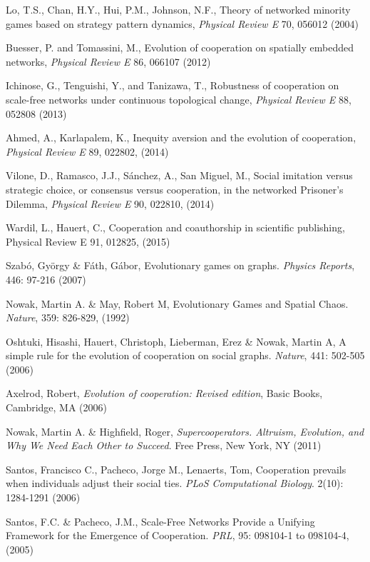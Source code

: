 \begin{thebibliography}{50}
 Lo, T.S., Chan, H.Y., Hui, P.M., Johnson, N.F.,
  Theory of networked minority games based on strategy pattern
  dynamics, \textit{Physical Review E} 70, 056012 (2004) 

 Buesser, P. and Tomassini, M., Evolution of
  cooperation on spatially embedded networks, \textit{Physical Review E} 86,
  066107 (2012)  

 Ichinose, G., Tenguishi, Y., and Tanizawa, T.,
  Robustness of cooperation on scale-free networks under continuous
  topological change, \textit{Physical Review E} 88, 052808 (2013) 

 Ahmed, A., Karlapalem, K., Inequity aversion and
  the evolution of cooperation, \textit{Physical Review E} 89, 022802, (2014)

 Vilone, D., Ramasco, J.J., S\'anchez, A., San
  Miguel, M., Social imitation versus strategic choice, or consensus
  versus cooperation, in the networked Prisoner’s Dilemma,
  \textit{Physical Review E} 90, 022810, (2014) 
 
 Wardil, L., Hauert, C., Cooperation and coauthorship in
  scientific publishing, Physical Review E 91, 012825, (2015)
  
 Szab\'o, Gy\"{o}rgy \& F\'ath, G\'abor,
  Evolutionary games on graphs. \textit{Physics Reports}, 446: 97-216
  (2007) 

 Nowak, Martin A. \& May, Robert M, Evolutionary
  Games and Spatial Chaos. \textit{Nature}, 359: 826-829, (1992)

 Oshtuki, Hisashi, Hauert, Christoph, Lieberman, Erez \& Nowak, Martin A, A simple rule for the evolution of cooperation on social graphs. \textit{Nature}, 441: 502-505 (2006)

 Axelrod, Robert, \textit{Evolution of cooperation: Revised edition}, Basic Books, Cambridge, MA (2006)

 Nowak, Martin A. \& Highfield, Roger,
  \textit{Supercooperators. Altruism, Evolution, and Why We Need Each
    Other to Succeed}. Free Press, New York, NY  (2011)

 Santos, Francisco C., Pacheco, Jorge M., Lenaerts, Tom, Cooperation prevails when individuals adjust their social ties. \textit{PLoS Computational Biology}. 2(10): 1284-1291 (2006)

 Santos, F.C. \& Pacheco, J.M., Scale-Free
  Networks Provide a Unifying Framework for the Emergence of
  Cooperation. \textit{PRL}, 95: 098104-1 to 098104-4, (2005) 


\end{thebibliography}
